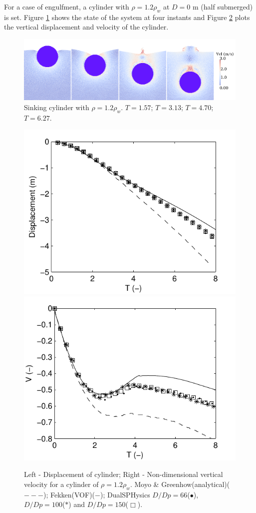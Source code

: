 %

For a case of engulfment, a cylinder with $\rho=1.2\rho_{w}$ at $D=0$ m (half submerged) is set. Figure \ref{fig:319_6_snaps} shows the state of the system at four instants and Figure \ref{fig:319_6} plots the vertical displacement and velocity of the cylinder.
%
\begin{figure}[ht!]
	\centering
	\includegraphics[width=0.9\linewidth]{Figures/5.Chapter/fig12_I}
	\caption{Sinking cylinder with $\rho=1.2\rho_{w}$. $T=1.57$; $T=3.13$; $T=4.70$; $T=6.27$.}
	\label{fig:319_6_snaps} 
\end{figure}
%
\begin{figure}[ht!]
	\centering
	\includegraphics[width=0.45\linewidth]{Figures/5.Chapter/fig17a}
	\includegraphics[width=0.45\linewidth]{Figures/5.Chapter/fig18a}
	\caption{{Left - Displacement of cylinder; Right - Non-dimensional vertical velocity for a cylinder of $\rho=1.2\rho_{w}$. Moyo \& Greenhow(analytical)\cite{Moyo-2000}($---$); Fekken(\ac{VOF})\cite{Fekken-2004}($-$); DualSPHysics $D/Dp=66$($\bullet$), $D/Dp=100$($\ast$) and $D/Dp=150$($\Box$).}}
	\label{fig:319_6} 
\end{figure}
%

